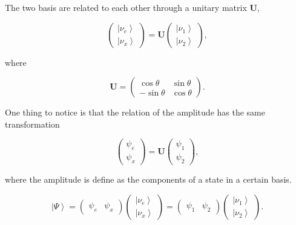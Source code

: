\documentclass{sciposter}
\newcommand{\ket}[1]{\left| #1\right\rangle}
\begin{document}
\begin{multicols}{3}
The two basis are related to each other through a unitary matrix $\mathbf{U}$,

\begin{equation}
     \begin{pmatrix}
     \ket{\nu_e} \\
     \ket{\nu_x}
     \end{pmatrix} = 
     \mathbf{U}
     \begin{pmatrix}
     \ket{\nu_1} \\
     \ket{\nu_2}
     \end{pmatrix},
\end{equation}


where

\begin{equation}
     \mathbf{U}=\begin{pmatrix}
     \cos \theta & \sin \theta \\
     -\sin \theta & \cos \theta
     \end{pmatrix}.
\end{equation}

One thing to notice is that the relation of the amplitude has the same transformation

\begin{equation}
     \begin{pmatrix}
     \psi_e \\
     \psi_x
     \end{pmatrix} = 
     \mathbf{U}
     \begin{pmatrix}
     \psi_1 \\
     \psi_2
     \end{pmatrix},
\end{equation}

where the amplitude is define as the components of a state in a certain basis. 

\begin{equation}
     \ket{\Psi} = \begin{pmatrix}
      \psi_e  & \psi_x
     \end{pmatrix} \begin{pmatrix}
     \ket{\nu_e} \\
     \ket{\nu_x}
     \end{pmatrix} =  \begin{pmatrix}
      \psi_1  & \psi_2
     \end{pmatrix} \begin{pmatrix}
     \ket{\nu_1} \\
     \ket{\nu_2}
     \end{pmatrix}.
\end{equation}




\end{multicols}
\end{document}
